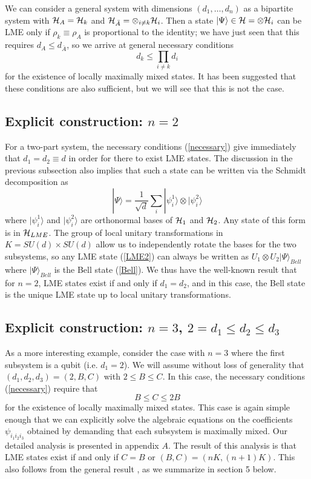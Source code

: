 \documentclass[12pt]{article}
\theoremstyle{definition}
\newcommand{\be}{\begin{equation}}
\newcommand{\ee}{\end{equation}}
\begin{document}
We can consider a general system with dimensions $(d_1,\dots, d_n)$ as a bipartite system with ${\cal H}_A = {\cal H}_k$ and ${\cal H}_{\bar{A}} = \otimes_{i \ne k} {\cal H}_i$. Then a state $|\Psi \rangle \in {\cal H} = \otimes {\cal H}_i$ can be LME only if $\rho_k \equiv \rho_A$ is proportional to the identity; we have just seen that this requires $d_A \le d_{\bar{A}}$, so we arrive at general necessary conditions
\be
\label{necessary}
d_k \le \prod_{i \ne k} d_i
\ee
for the existence of locally maximally mixed states. It has been suggested that these conditions are also sufficient, but we will see that this is not the case.

\subsection{Explicit construction: $n=2$}

For a two-part system, the necessary conditions (\ref{necessary}) give
immediately that $d_1 = d_2 \equiv d$ in order for there to exist LME
states. The discussion in the previous subsection also implies that
such a state can be written via the Schmidt decomposition as 
\be
\label{LME2} |\Psi \rangle = \frac{1}{\sqrt{d}} \sum_i |\psi_i^1
\rangle \otimes |\psi_i^2 \rangle \ee 
where $|\psi_i^1 \rangle$ and
$|\psi_i^2 \rangle$ are orthonormal bases of ${\cal H}_1$ and ${\cal
H}_2$. Any state of this form is in ${\cal H}_{LME}$. The group of
local unitary transformations in $K = SU(d) \times SU(d)$ allow us to
independently rotate the bases for the two subsystems, so any LME
state (\ref{LME2}) can always be written as $U_1 \otimes U_2 |\Psi
\rangle_{Bell}$ where $|\Psi \rangle_{Bell}$ is the Bell state
(\ref{Bell}). We thus have the well-known result that for $n=2$, LME
states exist if and only if $d_1 = d_2$, and in this case, the Bell
state is the unique LME state up to local unitary transformations.

\subsection{Explicit construction: $n=3$, $2 = d_1 \le d_2 \le d_3$}\label{sec:Explicit23}

As a more interesting example, consider the case with $n=3$ where the
first subsystem is a qubit (i.e. $d_1 = 2$). We will assume without
loss of generality that $(d_1, d_2, d_3) = (2,B,C)$ with $2 \le B \le
C$. In this case, the necessary conditions (\ref{necessary}) require
that \be B \le C \le 2 B \ee for the existence of locally maximally
mixed states. This case is again simple enough that we can explicitly
solve the algebraic equations on the coefficients $\psi_{i_1 i_2 i_3}$
obtained by demanding that each subsystem is maximally mixed. Our
detailed analysis is presented in appendix $A$. The result of this
analysis is that LME states exist if and only if $C=B$ or $(B,C) =
(nK,(n+1)K)$. This also follows from the general result
\cite{mathpaper}, as we summarize in section 5 below.
\end{document}
